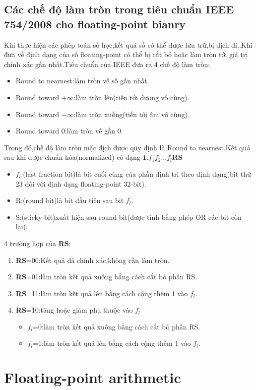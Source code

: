 \documentclass[11pt,a4paper,vietnamese]{report}
\begin{document}
\section{Các chế độ làm tròn trong tiêu chuẩn IEEE 754/2008 cho floating-point bianry}
Khi thực hiện các phép toán số học,kết quả số có thể được lưu trữ,bị dịch đi..Khi đưa về định dạng của số floating-point có thể bị cắt bỏ hoặc làm tròn tới giá trị chính xác gần nhất.Tiêu chuẩn của IEEE đưa ra 4 chế độ làm tròn:
\begin{itemize}
\item Round to nearnest:làm tròn về số gần nhất.
\item Round toward $+\infty$:làm tròn lên(tiến tới dương vô cùng).
\item Round toward  $-\infty$:làm tròn xuống(tiến tới âm vô cùng).
\item Round toward 0:làm tròn về gần 0.
\end{itemize}
Trong đó,chế độ làm tròn mặc địch được quy định là Round to nearnest.Kết quả sau khi được chuẩn hóa(normalized) có dạng $\textbf{1.}f_1f_2...f_l\textbf{RS}$
\begin{itemize}
\item $f_l$:(last fraction bit)là bit cuối cùng của phần định trị theo định dạng(bit thứ 23 đối với định dạng floating-point 32-bit).
\item R:(round bit)là bit đầu tiên sau bit $f_l$.
\item S:(sticky bit)xuất hiện sau round bit(được tính bằng phép OR các bit còn lại).
\end{itemize}
4 trường hợp của \textbf{RS}:
\begin{enumerate}
\item \textbf{RS}=00:Kết quả đã chính xác,không cần làm tròn.
\item \textbf{RS}=01:làm tròn kết quả xuống bằng cách cắt bỏ phần RS.
\item \textbf{RS}=11:làm tròn kết quả lên bằng cách cộng thêm 1 vào $f_l$.
\item \textbf{RS}=10:tăng hoặc giảm phụ thuộc vào $f_l$
\begin{itemize}
\item $f_l$=0:làm tròn kết quả xuống bằng cách cắt bỏ phần RS.
\item $f_l$=1:làm tròn kết quả lên bằng cách cộng thêm 1 vào $f_l$.
\end{itemize}
\end{enumerate}
\chapter{Floating-point arithmetic}
\end{document}
